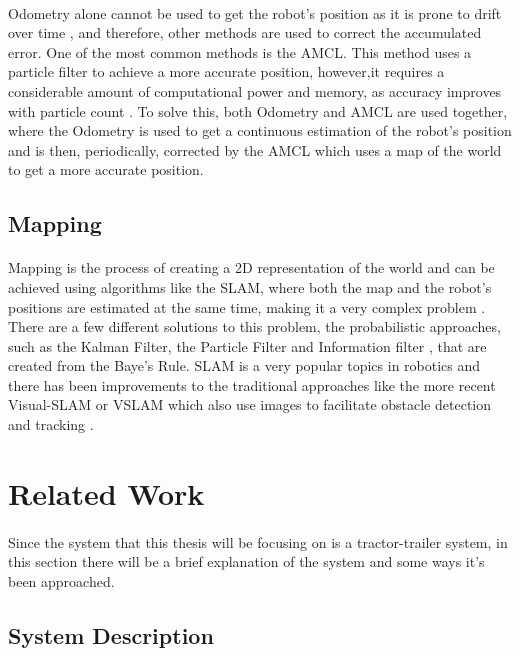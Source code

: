 \paragraph{}Odometry alone cannot be used to get the robot's position as it is prone to drift over time \cite{odom1}, 
and therefore, other methods are used to correct the accumulated error. One of the most common methods is 
the \gls{AMCL}. This method uses a particle filter to achieve a more accurate position, however,it requires 
a considerable amount of computational power and memory, as accuracy improves with particle count \cite{AMCL1}. To solve this, 
both Odometry and \gls{AMCL} are used together, where the Odometry is used to get a continuous estimation of the robot's position and is 
then, periodically, corrected by the \gls{AMCL} which uses a map of the world to get a more accurate position.

\subsection{Mapping}
\label{subsec:Mapping}
\paragraph{}Mapping is the process of creating a 2D representation of the world and can be achieved using 
algorithms like the \gls{SLAM}, where both the map and the robot's positions are 
estimated at the same time, making it a very complex problem \cite{SLAM1}. There are a few different 
solutions to this problem, the probabilistic approaches, such as the Kalman Filter, the 
Particle Filter and Information filter \cite{SLAM1}, that are created from the Baye's Rule. \gls{SLAM} 
is a very popular topics in robotics and there has been improvements to the traditional approaches 
like the more recent Visual-SLAM or VSLAM which also use images to facilitate obstacle detection and 
tracking \cite{VSLAM1}.
\section{Related Work}
\label{sec:TTS}
\paragraph{}Since the system that this thesis will be focusing on is a tractor-trailer system, 
in this section there will be a brief explanation of the system and some ways it's been approached.

\subsection{System Description}
\label{subsec:SD}
